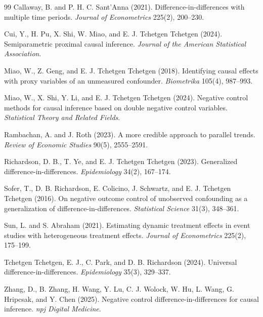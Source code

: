 \documentclass[11pt]{article}
\theoremstyle{definition}
\theoremstyle{plain}
\theoremstyle{remark}
\begin{document}
\begin{thebibliography}{99}
Callaway, B. and P. H. C. Sant'Anna (2021).
Difference-in-differences with multiple time periods.
\emph{Journal of Econometrics} 225(2), 200--230.

Cui, Y., H. Pu, X. Shi, W. Miao, and E. J. Tchetgen Tchetgen (2024).
Semiparametric proximal causal inference.
\emph{Journal of the American Statistical Association}.

Miao, W., Z. Geng, and E. J. Tchetgen Tchetgen (2018).
Identifying causal effects with proxy variables of an unmeasured confounder.
\emph{Biometrika} 105(4), 987--993.

Miao, W., X. Shi, Y. Li, and E. J. Tchetgen Tchetgen (2024).
Negative control methods for causal inference based on double negative control variables.
\emph{Statistical Theory and Related Fields}.

Rambachan, A. and J. Roth (2023).
A more credible approach to parallel trends.
\emph{Review of Economic Studies} 90(5), 2555--2591.

Richardson, D. B., T. Ye, and E. J. Tchetgen Tchetgen (2023).
Generalized difference-in-differences.
\emph{Epidemiology} 34(2), 167--174.

Sofer, T., D. B. Richardson, E. Colicino, J. Schwartz, and E. J. Tchetgen Tchetgen (2016).
On negative outcome control of unobserved confounding as a generalization of difference-in-differences.
\emph{Statistical Science} 31(3), 348--361.

Sun, L. and S. Abraham (2021).
Estimating dynamic treatment effects in event studies with heterogeneous treatment effects.
\emph{Journal of Econometrics} 225(2), 175--199.

Tchetgen Tchetgen, E. J., C. Park, and D. B. Richardson (2024).
Universal difference-in-differences.
\emph{Epidemiology} 35(3), 329--337.

Zhang, D., B. Zhang, H. Wang, Y. Lu, C. J. Wolock, W. Hu, L. Wang, G. Hripcsak, and Y. Chen (2025).
Negative control difference-in-differences for causal inference.
\emph{npj Digital Medicine}.
\end{thebibliography}
\end{document}

